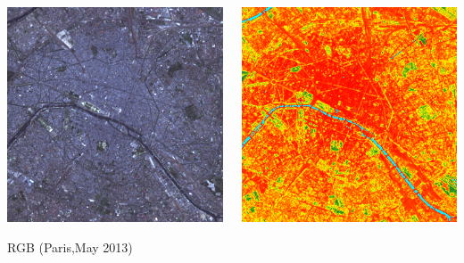 \documentclass[c]{beamer}
\begin{document}
\begin{frame}
\begin{columns}
 \begin{column}{0.33\textwidth}
  \begin{overlayarea}{\linewidth}{2cm}
  \centering\vfill
  \includegraphics[scale=0.15]{images/Paris/05_rgb.png}
  \end{overlayarea}
  \begin{overlayarea}{\linewidth}{0.5cm}
  \centering
  \tiny RGB (Paris,May 2013) \par
  \end{overlayarea}
 \end{column}
  \begin{column}{0.33\textwidth}
  \begin{overlayarea}{\linewidth}{2cm}
  \centering\vfill
  \centerline{
  \includegraphics[scale=0.15]{images/Paris/05_ndvi.png}
}
\end{overlayarea}
\end{column}
\end{columns}
\end{frame}
\end{document}
